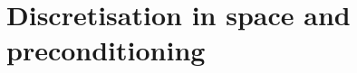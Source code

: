 \documentclass[hyperref={pdfpagemode=FullScreen},9pt]{beamer}
\newcommand{\Frac}[2] {\frac{\textstyle #1} {\textstyle #2}}
\begin{document}
 \section{Discretisation in space and preconditioning}
\end{document}
